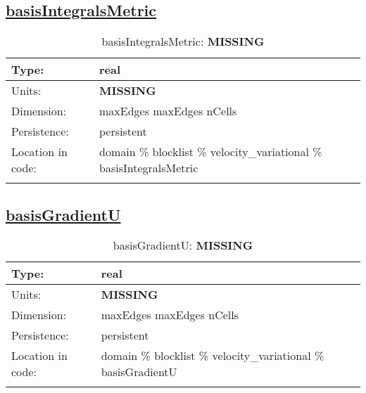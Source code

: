 \subsection[basisIntegralsMetric]{\hyperref[sec:var_tab_velocity_variational]{basisIntegralsMetric}}
\label{subsec:var_sec_velocity_variational_basisIntegralsMetric}
\begin{center}
\begin{longtable}{| p{2.0in} | p{4.0in} |}
        \hline 
        Type: & real \\
        \hline 
        Units: & {\bf \color{red} MISSING} \\
        \hline 
        Dimension: & maxEdges maxEdges nCells \\
        \hline 
        Persistence: & persistent \\
        \hline 
         Location in code: & domain \% blocklist \% velocity\_variational \% basisIntegralsMetric \\
         \hline 
    \caption{basisIntegralsMetric: {\bf \color{red} MISSING}}
\end{longtable}
\end{center}
\subsection[basisGradientU]{\hyperref[sec:var_tab_velocity_variational]{basisGradientU}}
\label{subsec:var_sec_velocity_variational_basisGradientU}
\begin{center}
\begin{longtable}{| p{2.0in} | p{4.0in} |}
        \hline 
        Type: & real \\
        \hline 
        Units: & {\bf \color{red} MISSING} \\
        \hline 
        Dimension: & maxEdges maxEdges nCells \\
        \hline 
        Persistence: & persistent \\
        \hline 
         Location in code: & domain \% blocklist \% velocity\_variational \% basisGradientU \\
         \hline 
    \caption{basisGradientU: {\bf \color{red} MISSING}}
\end{longtable}
\end{center}
